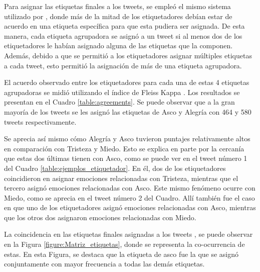 Para asignar las etiquetas finales a los tweets, se empleó el mismo sistema utilizado por \cite{mohammad2015sentiment}, donde más de la mitad de los etiquetadores debían estar de acuerdo en una etiqueta específica para que esta pudiera ser asignada. De esta manera, cada etiqueta agrupadora se asignó a un tweet si al menos dos de los etiquetadores le habían asignado alguna de las etiquetas que la componen. Además, debido a que se permitió a los etiquetadores asignar múltiples etiquetas a cada tweet, esto permitió la asignación de más de una etiqueta agrupadora.

El acuerdo observado entre los etiquetadores para cada una de estas 4 etiquetas agrupadoras se midió utilizando el índice de Fleiss Kappa \citep{fleiss1971measuring}. Los resultados se presentan en el Cuadro \ref{table:agreements}. Se puede observar que a la gran mayoría de los tweets se les asignó las etiquetas de Asco y Alegría con 464 y 580 tweets respectivamente.



Se aprecia así mismo cómo Alegría y Asco tuvieron puntajes relativamente altos en comparación con Tristeza y Miedo. Esto se explica en parte por la cercanía que estas dos últimas tienen con Asco, como se puede ver en el tweet número 1 del Cuadro \ref{table:ejemplos_etiquetador}. En él, dos de los etiquetadores coincidieron en asignar emociones relacionadas con Tristeza, mientras que el tercero asignó emociones relacionadas con Asco. Este mismo fenómeno ocurre con Miedo, como se aprecia en el tweet número 2 del Cuadro. Allí también fue el caso en que uno de los etiquetadores asignó emociones relacionadas con Asco, mientras que los otros dos asignaron emociones relacionadas con Miedo.

\scriptsize

\normalsize

La coincidencia en las etiquetas finales asignadas a los tweets , se puede observar en la Figura \ref{figure:Matriz_etiquetas}, donde se representa la co-ocurrencia de estas. En esta Figura, se destaca que la etiqueta de asco fue la que se asignó conjuntamente con mayor frecuencia a todas las demás etiquetas.

